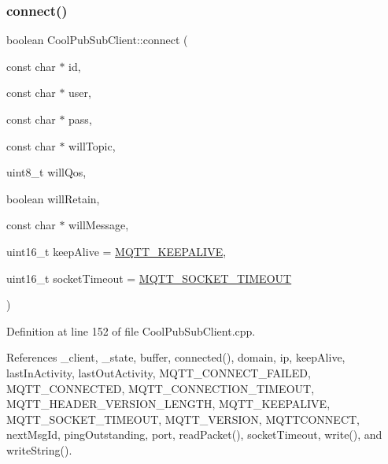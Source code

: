 \subsubsection{\texorpdfstring{connect()}{connect()}\hspace{0.1cm}{\footnotesize\ttfamily [4/4]}}
{\footnotesize\ttfamily boolean Cool\+Pub\+Sub\+Client\+::connect (\begin{DoxyParamCaption}\item[{const char $\ast$}]{id,  }\item[{const char $\ast$}]{user,  }\item[{const char $\ast$}]{pass,  }\item[{const char $\ast$}]{will\+Topic,  }\item[{uint8\+\_\+t}]{will\+Qos,  }\item[{boolean}]{will\+Retain,  }\item[{const char $\ast$}]{will\+Message,  }\item[{uint16\+\_\+t}]{keep\+Alive = {\ttfamily \hyperlink{_cool_pub_sub_client_8h_afb4dd8c75385ab30e659314df7c2c335}{M\+Q\+T\+T\+\_\+\+K\+E\+E\+P\+A\+L\+I\+VE}},  }\item[{uint16\+\_\+t}]{socket\+Timeout = {\ttfamily \hyperlink{_cool_pub_sub_client_8h_a092cc564e4d7f03fdab6137e30a7f05b}{M\+Q\+T\+T\+\_\+\+S\+O\+C\+K\+E\+T\+\_\+\+T\+I\+M\+E\+O\+UT}} }\end{DoxyParamCaption})}



Definition at line 152 of file Cool\+Pub\+Sub\+Client.\+cpp.



References \+\_\+client, \+\_\+state, buffer, connected(), domain, ip, keep\+Alive, last\+In\+Activity, last\+Out\+Activity, M\+Q\+T\+T\+\_\+\+C\+O\+N\+N\+E\+C\+T\+\_\+\+F\+A\+I\+L\+ED, M\+Q\+T\+T\+\_\+\+C\+O\+N\+N\+E\+C\+T\+ED, M\+Q\+T\+T\+\_\+\+C\+O\+N\+N\+E\+C\+T\+I\+O\+N\+\_\+\+T\+I\+M\+E\+O\+UT, M\+Q\+T\+T\+\_\+\+H\+E\+A\+D\+E\+R\+\_\+\+V\+E\+R\+S\+I\+O\+N\+\_\+\+L\+E\+N\+G\+TH, M\+Q\+T\+T\+\_\+\+K\+E\+E\+P\+A\+L\+I\+VE, M\+Q\+T\+T\+\_\+\+S\+O\+C\+K\+E\+T\+\_\+\+T\+I\+M\+E\+O\+UT, M\+Q\+T\+T\+\_\+\+V\+E\+R\+S\+I\+ON, M\+Q\+T\+T\+C\+O\+N\+N\+E\+CT, next\+Msg\+Id, ping\+Outstanding, port, read\+Packet(), socket\+Timeout, write(), and write\+String().


